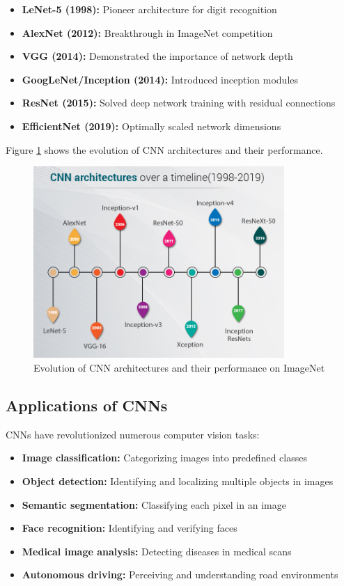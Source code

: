 \documentclass[11pt,a4paper]{report}
\begin{document}
\begin{itemize}
    \item \textbf{LeNet-5 (1998):} Pioneer architecture for digit recognition
    \item \textbf{AlexNet (2012):} Breakthrough in ImageNet competition
    \item \textbf{VGG (2014):} Demonstrated the importance of network depth
    \item \textbf{GoogLeNet/Inception (2014):} Introduced inception modules
    \item \textbf{ResNet (2015):} Solved deep network training with residual connections
    \item \textbf{EfficientNet (2019):} Optimally scaled network dimensions
\end{itemize}

Figure \ref{fig:cnn-milestones} shows the evolution of CNN architectures and their performance.

\begin{figure}[ht]
    \centering
    \includegraphics[width=0.85\textwidth]{cnn_milestones.jpg}
    \caption{Evolution of CNN architectures and their performance on ImageNet}
    \label{fig:cnn-milestones}
\end{figure}

\subsection{Applications of CNNs}
CNNs have revolutionized numerous computer vision tasks:
\begin{itemize}
    \item \textbf{Image classification:} Categorizing images into predefined classes
    \item \textbf{Object detection:} Identifying and localizing multiple objects in images
    \item \textbf{Semantic segmentation:} Classifying each pixel in an image
    \item \textbf{Face recognition:} Identifying and verifying faces
    \item \textbf{Medical image analysis:} Detecting diseases in medical scans
    \item \textbf{Autonomous driving:} Perceiving and understanding road environments
\end{itemize}
\end{document}
